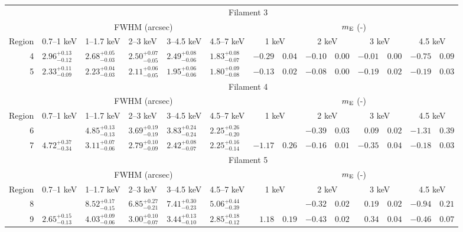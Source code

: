 \begin{tabular}{@{}rlllllr@{ $\pm$ }lr@{ $\pm$ }lr@{ $\pm$ }lr@{ $\pm$ }l@{}}
\midrule
{} & \multicolumn{13}{c}{Filament 3} \\
\cmidrule(l){2-14}
{} & \multicolumn{5}{c}{FWHM (arcsec)} & \multicolumn{8}{c}{$m_\mathrm{E}$ (-)} \\
\cmidrule(lr){2-6} \cmidrule(l){7-14}
Region & 0.7--1 keV & 1--1.7 keV & 2--3 keV & 3--4.5 keV & 4.5--7 keV
       & \multicolumn{2}{c}{1 keV} & \multicolumn{2}{c}{2 keV}
       & \multicolumn{2}{c}{3 keV} & \multicolumn{2}{c}{4.5 keV} \\
\cmidrule{1-14}
4 & ${2.96}^{+0.13}_{-0.12}$ & ${2.68}^{+0.05}_{-0.03}$ & ${2.50}^{+0.07}_{-0.05}$ & ${2.49}^{+0.08}_{-0.06}$ & ${1.83}^{+0.08}_{-0.07}$
  & $-0.29$ & $0.04$ & $-0.10$ & $0.00$ & $-0.01$ & $0.00$ & $-0.75$ & $0.09$ \\
5 & ${2.33}^{+0.11}_{-0.09}$ & ${2.23}^{+0.04}_{-0.03}$ & ${2.11}^{+0.06}_{-0.05}$ & ${1.95}^{+0.06}_{-0.06}$ & ${1.80}^{+0.09}_{-0.08}$
  & $-0.13$ & $0.02$ & $-0.08$ & $0.00$ & $-0.19$ & $0.02$ & $-0.19$ & $0.03$ \\

\midrule
{} & \multicolumn{13}{c}{Filament 4} \\
\cmidrule(l){2-14}
{} & \multicolumn{5}{c}{FWHM (arcsec)} & \multicolumn{8}{c}{$m_\mathrm{E}$ (-)} \\
\cmidrule(lr){2-6} \cmidrule(l){7-14}
Region & 0.7--1 keV & 1--1.7 keV & 2--3 keV & 3--4.5 keV & 4.5--7 keV
       & \multicolumn{2}{c}{1 keV} & \multicolumn{2}{c}{2 keV}
       & \multicolumn{2}{c}{3 keV} & \multicolumn{2}{c}{4.5 keV} \\
\cmidrule{1-14}
6 & {} & ${4.85}^{+0.13}_{-0.13}$ & ${3.69}^{+0.19}_{-0.19}$ & ${3.83}^{+0.24}_{-0.24}$ & ${2.25}^{+0.26}_{-0.20}$
  & \multicolumn{2}{c}{} & $-0.39$ & $0.03$ & $0.09$ & $0.02$ & $-1.31$ & $0.39$ \\
7 & ${4.72}^{+0.37}_{-0.34}$ & ${3.11}^{+0.07}_{-0.06}$ & ${2.79}^{+0.10}_{-0.09}$ & ${2.42}^{+0.08}_{-0.07}$ & ${2.25}^{+0.16}_{-0.14}$
  & $-1.17$ & $0.26$ & $-0.16$ & $0.01$ & $-0.35$ & $0.04$ & $-0.18$ & $0.03$ \\

\midrule
{} & \multicolumn{13}{c}{Filament 5} \\
\cmidrule(l){2-14}
{} & \multicolumn{5}{c}{FWHM (arcsec)} & \multicolumn{8}{c}{$m_\mathrm{E}$ (-)} \\
\cmidrule(lr){2-6} \cmidrule(l){7-14}
Region & 0.7--1 keV & 1--1.7 keV & 2--3 keV & 3--4.5 keV & 4.5--7 keV
       & \multicolumn{2}{c}{1 keV} & \multicolumn{2}{c}{2 keV}
       & \multicolumn{2}{c}{3 keV} & \multicolumn{2}{c}{4.5 keV} \\
\cmidrule{1-14}
8 & {} & ${8.52}^{+0.17}_{-0.15}$ & ${6.85}^{+0.27}_{-0.21}$ & ${7.41}^{+0.30}_{-0.23}$ & ${5.06}^{+0.44}_{-0.39}$
  & \multicolumn{2}{c}{} & $-0.32$ & $0.02$ & $0.19$ & $0.02$ & $-0.94$ & $0.21$ \\
9 & ${2.65}^{+0.15}_{-0.13}$ & ${4.03}^{+0.09}_{-0.06}$ & ${3.00}^{+0.10}_{-0.07}$ & ${3.44}^{+0.13}_{-0.10}$ & ${2.85}^{+0.18}_{-0.12}$
  & $1.18$ & $0.19$ & $-0.43$ & $0.02$ & $0.34$ & $0.04$ & $-0.46$ & $0.07$ \\


\end{tabular}
